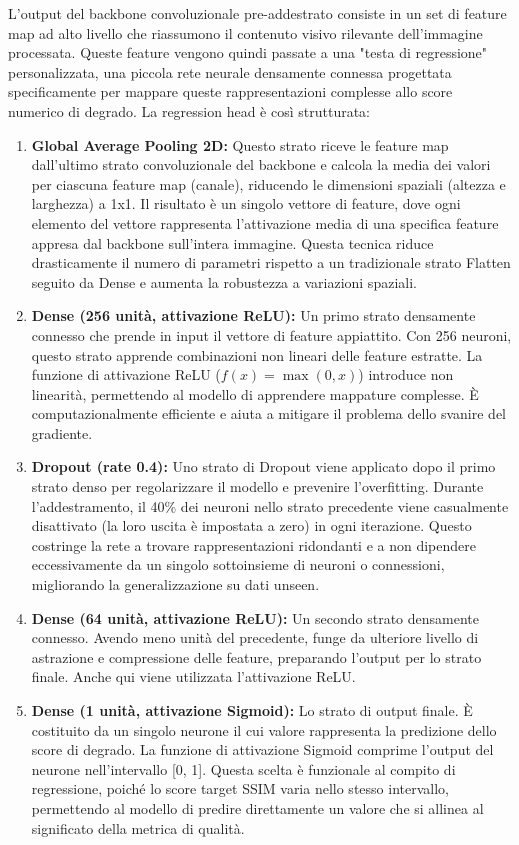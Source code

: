 L'output del backbone convoluzionale pre-addestrato consiste in un set di feature map ad alto livello che riassumono il contenuto visivo rilevante dell'immagine processata. Queste feature vengono quindi passate a una "testa di regressione" personalizzata, una piccola rete neurale densamente connessa progettata specificamente per mappare queste rappresentazioni complesse allo score numerico di degrado. La regression head è così strutturata:
\begin{enumerate}
    \item \textbf{Global Average Pooling 2D:} Questo strato riceve le feature map dall'ultimo strato convoluzionale del backbone e calcola la media dei valori per ciascuna feature map (canale), riducendo le dimensioni spaziali (altezza e larghezza) a 1x1. Il risultato è un singolo vettore di feature, dove ogni elemento del vettore rappresenta l'attivazione media di una specifica feature appresa dal backbone sull'intera immagine. Questa tecnica riduce drasticamente il numero di parametri rispetto a un tradizionale strato Flatten seguito da Dense e aumenta la robustezza a variazioni spaziali.
    \item \textbf{Dense (256 unità, attivazione ReLU):} Un primo strato densamente connesso che prende in input il vettore di feature appiattito. Con 256 neuroni, questo strato apprende combinazioni non lineari delle feature estratte. La funzione di attivazione ReLU ($f(x) = \max(0, x)$) introduce non linearità, permettendo al modello di apprendere mappature complesse. È computazionalmente efficiente e aiuta a mitigare il problema dello svanire del gradiente.
    \item \textbf{Dropout (rate 0.4):} Uno strato di Dropout viene applicato dopo il primo strato denso per regolarizzare il modello e prevenire l'overfitting. Durante l'addestramento, il 40\% dei neuroni nello strato precedente viene casualmente disattivato (la loro uscita è impostata a zero) in ogni iterazione. Questo costringe la rete a trovare rappresentazioni ridondanti e a non dipendere eccessivamente da un singolo sottoinsieme di neuroni o connessioni, migliorando la generalizzazione su dati unseen.
    \item \textbf{Dense (64 unità, attivazione ReLU):} Un secondo strato densamente connesso. Avendo meno unità del precedente, funge da ulteriore livello di astrazione e compressione delle feature, preparando l'output per lo strato finale. Anche qui viene utilizzata l'attivazione ReLU.
    \item \textbf{Dense (1 unità, attivazione Sigmoid):} Lo strato di output finale. È costituito da un singolo neurone il cui valore rappresenta la predizione dello score di degrado. La funzione di attivazione Sigmoid comprime l'output del neurone nell'intervallo [0, 1]. Questa scelta è funzionale al compito di regressione, poiché lo score target SSIM varia nello stesso intervallo, permettendo al modello di predire direttamente un valore che si allinea al significato della metrica di qualità.
\end{enumerate}

